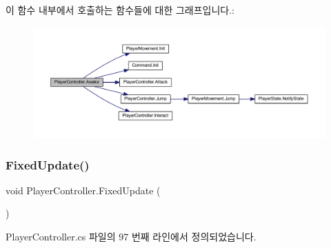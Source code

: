 이 함수 내부에서 호출하는 함수들에 대한 그래프입니다.\+:\nopagebreak
\begin{figure}[H]
\begin{center}
\leavevmode
\includegraphics[width=350pt]{dc/dde/class_player_controller_a050967f0e5c2340cb21861e4c8c788a1_cgraph}
\end{center}
\end{figure}
\mbox{\label{class_player_controller_ae5bdb1b48571f67c3f722a58b6f404d4}} 
\subsubsection{\texorpdfstring{FixedUpdate()}{FixedUpdate()}}
{\footnotesize\ttfamily void Player\+Controller.\+Fixed\+Update (\begin{DoxyParamCaption}{ }\end{DoxyParamCaption})\hspace{0.3cm}{\ttfamily [private]}}



Player\+Controller.\+cs 파일의 97 번째 라인에서 정의되었습니다.


